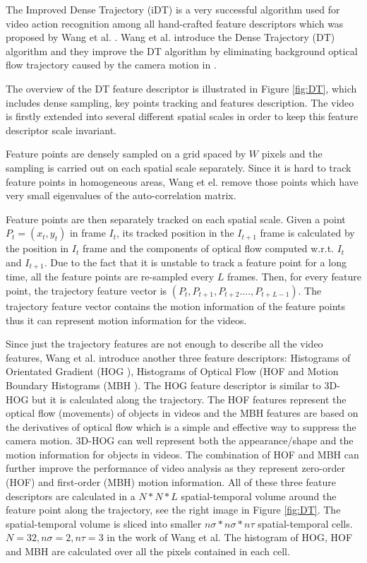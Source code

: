 The Improved Dense Trajectory (iDT) is a very successful algorithm used for video action recognition among all hand-crafted feature descriptors which was proposed by Wang et al. \cite{wang2012} \cite{wang2013}.  Wang et al. \cite{wang2012} introduce the Dense Trajectory (DT) algorithm and they improve the DT algorithm by eliminating background optical flow trajectory caused by the camera motion in \cite{wang2013}.
\par
The overview of the DT feature descriptor is illustrated in Figure \ref{fig:DT}, which includes dense sampling, key points tracking and features description. The video is firstly extended into several different spatial scales in order to keep this feature descriptor scale invariant.
\par 
Feature points are densely sampled on a grid spaced by \(W\) pixels and the sampling is carried out on each spatial scale separately. Since it is hard to track feature points in homogeneous areas, Wang et el. remove those points which have very small eigenvalues of the auto-correlation matrix. 
\par 
Feature points are then separately tracked on each spatial scale. Given a point \(P_t = (x_t,y_t)\) in frame \(I_t\), its tracked position in the \(I_{t+1}\) frame  is calculated by the position in \(I_t\) frame and the components of optical flow computed  w.r.t. \(I_t\) and \(I_{t+1}\). Due to the fact that it is unstable to track a feature point for a long time, all the feature points are re-sampled every \(L\) frames. Then, for every feature point, the trajectory feature vector is \((P_t,P_{t+1},P_{t+2}....,P_{t+L-1})\). The trajectory feature vector contains the motion information of the feature points thus it can represent motion information for the videos. 
\par 
Since just the trajectory features are not enough to describe all the video features, Wang et al. introduce another three feature descriptors: Histograms of Orientated Gradient (HOG \cite{hog}), Histograms of Optical Flow (HOF \cite{hof} and Motion Boundary Histograms (MBH \cite{hof}). The HOG feature descriptor is similar to 3D-HOG but it is calculated along the trajectory. The HOF features represent the optical flow (movements) of objects in videos and the MBH features are based on the derivatives of optical flow which is a simple and effective way to suppress the camera motion. 3D-HOG can well represent both the appearance/shape and the motion information for objects in videos. The combination of HOF and MBH can further improve the performance of video analysis as they represent zero-order (HOF) and first-order (MBH) motion information. All of these three feature descriptors are calculated in a \(N*N*L\) spatial-temporal volume around the feature point along the trajectory, see the right image in Figure \ref{fig:DT}. The spatial-temporal volume is sliced into smaller \(n\sigma * n\sigma * n\tau \) spatial-temporal cells. \(N= 32, n\sigma = 2, n\tau = 3 \) in the work of Wang et al. The histogram of HOG, HOF and MBH are calculated over all the pixels contained in each cell.

